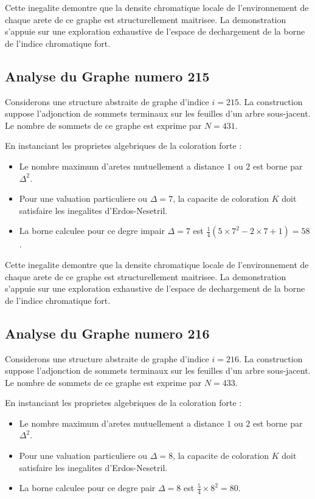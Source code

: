 \documentclass[11pt,a4paper]{article}
\begin{document}
Cette inegalite demontre que la densite chromatique locale de l'environnement de chaque arete de ce graphe est structurellement maitrisee. La demonstration s'appuie sur une exploration exhaustive de l'espace de dechargement de la borne de l'indice chromatique fort.

\subsection{Analyse du Graphe numero 215}
Considerons une structure abstraite de graphe d'indice $i = 215$. La construction suppose l'adjonction de sommets terminaux sur les feuilles d'un arbre sous-jacent. Le nombre de sommets de ce graphe est exprime par $N = 431$.

En instanciant les proprietes algebriques de la coloration forte :
\begin{itemize}
\item Le nombre maximum d'aretes mutuellement a distance $1$ ou $2$ est borne par $\Delta^2$.
\item Pour une valuation particuliere ou $\Delta = 7$, la capacite de coloration $K$ doit satisfaire les inegalites d'Erdos-Nesetril.
\item La borne calculee pour ce degre impair $\Delta = 7$ est $\frac{1}{4}(5 \times 7^2 - 2 \times 7 + 1) = 58$.
\end{itemize}

Cette inegalite demontre que la densite chromatique locale de l'environnement de chaque arete de ce graphe est structurellement maitrisee. La demonstration s'appuie sur une exploration exhaustive de l'espace de dechargement de la borne de l'indice chromatique fort.

\subsection{Analyse du Graphe numero 216}
Considerons une structure abstraite de graphe d'indice $i = 216$. La construction suppose l'adjonction de sommets terminaux sur les feuilles d'un arbre sous-jacent. Le nombre de sommets de ce graphe est exprime par $N = 433$.

En instanciant les proprietes algebriques de la coloration forte :
\begin{itemize}
\item Le nombre maximum d'aretes mutuellement a distance $1$ ou $2$ est borne par $\Delta^2$.
\item Pour une valuation particuliere ou $\Delta = 8$, la capacite de coloration $K$ doit satisfaire les inegalites d'Erdos-Nesetril.
\item La borne calculee pour ce degre pair $\Delta = 8$ est $\frac{5}{4} \times 8^2 = 80$.
\end{itemize}
\end{document}
